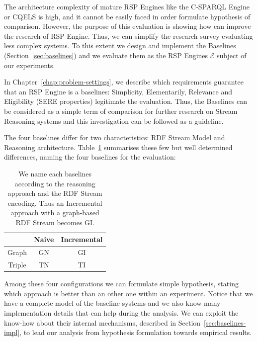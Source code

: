 The architecture complexity of mature RSP Engines like the C-SPARQL Engine or CQELS is high, and it cannot be easily faced in order formulate hypothesis of comparison. However, the purpose of this evaluation is showing how \name can improve the research of RSP Engine. Thus, we can simplify the research survey evaluating less complex systems. To this extent we design and implement the Baselines (Section~\ref{sec:baselines}) and we evaluate them as the RSP Engines $\mathcal{E}$ subject of our experiments. 

In Chapter~\ref{chap:problem-settings}, we describe which requirements guarantee that an RSP Engine is a baselines: Simplicity, Elementarily, Relevance and Eligibility (SERE properties) legitimate the evaluation. Thus, the Baselines can be considered as a simple term of comparison for further research on Stream Reasoning systems and this investigation can be followed as a guideline.
 
The four baselines differ for two characteristics: RDF Stream Model and Reasoning architecture. Table~\ref{tab:baselines-names} summarises these few but well determined differences, naming the four baselines for the evaluation:
\begin{table}[htb]
\centering
\normalsize
\begin{tabular}{c|cc} %
	\hline
         & Naive & Incremental\\
	\hline
	Graph        &  GN      & GI\\
	Triple   &  TN   & TI\\
	\hline %
\end{tabular}
\caption[Baselines Naming Convention]{We name each baselines according to  the reasoning approach and the RDF Stream encoding. Thus an Incremental approach with a graph-based RDF Stream becomes GI.}
\label{tab:baselines-names}
\end{table}

\noindent Among these four configurations we can formulate simple hypothesis, stating which approach is better than an other one within an experiment. Notice that we have a complete model of the baseline systems and we also know many implementation details that can help during the analysis. We can exploit the know-how about their internal mechanisms, described in Section~\ref{sec:baselines-impl}, to lead our analysis from hypothesis formulation towards empirical results. 

